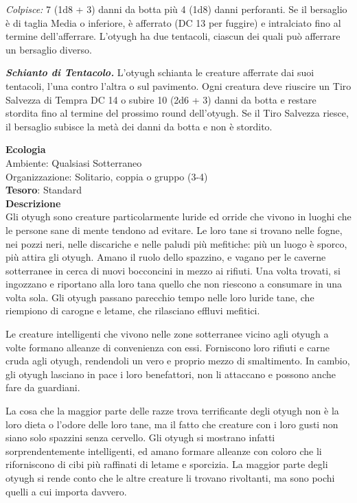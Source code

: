 \begin{multicols}{2}
\textit{Colpisce:} 7 (1d8 + 3) danni da botta più 4 (1d8) danni perforanti. Se il bersaglio è di taglia Media o inferiore, è afferrato (DC 13 per fuggire) e intralciato fino al termine dell'afferrare. L'otyugh ha due tentacoli, ciascun dei quali può afferrare un bersaglio diverso.

\textit{\textbf{Schianto di Tentacolo.}} L'otyugh schianta le creature afferrate dai suoi tentacoli, l'una contro l'altra o sul pavimento. Ogni creatura deve riuscire un Tiro Salvezza di Tempra DC 14 o subire 10 (2d6 + 3) danni da botta e restare stordita fino al termine del prossimo round dell'otyugh. Se il Tiro Salvezza riesce, il bersaglio subisce la metà dei danni da botta e non è stordito.

\textbf{Ecologia}\\
Ambiente: Qualsiasi Sotterraneo\\
Organizzazione: Solitario, coppia o gruppo (3-4)\\
\textbf{Tesoro}: Standard\\
\textbf{Descrizione}\\
Gli otyugh sono creature particolarmente luride ed orride che vivono in luoghi che le persone sane di mente tendono ad evitare. Le loro tane si trovano nelle fogne, nei pozzi neri, nelle discariche e nelle paludi più mefitiche: più un luogo è sporco, più attira gli otyugh. Amano il ruolo dello spazzino, e vagano per le caverne sotterranee in cerca di nuovi bocconcini in mezzo ai rifiuti. Una volta trovati, si ingozzano e riportano alla loro tana quello che non riescono a consumare in una volta sola. Gli otyugh passano parecchio tempo nelle loro luride tane, che riempiono di carogne e letame, che rilasciano effluvi mefitici.

Le creature intelligenti che vivono nelle zone sotterranee vicino agli otyugh a volte formano alleanze di convenienza con essi. Forniscono loro rifiuti e carne cruda agli otyugh, rendendoli un vero e proprio mezzo di smaltimento. In cambio, gli otyugh lasciano in pace i loro benefattori, non li attaccano e possono anche fare da guardiani.

La cosa che la maggior parte delle razze trova terrificante degli otyugh non è la loro dieta o l'odore delle loro tane, ma il fatto che creature con i loro gusti non siano solo spazzini senza cervello. Gli otyugh si mostrano infatti sorprendentemente intelligenti, ed amano formare alleanze con coloro che li riforniscono di cibi più raffinati di letame e sporcizia. La maggior parte degli otyugh si rende conto che le altre creature li trovano rivoltanti, ma sono pochi quelli a cui importa davvero.


\end{multicols}
